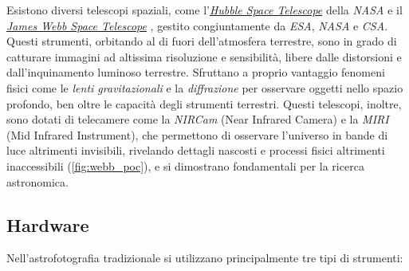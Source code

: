 Esistono diversi telescopi spaziali, come l'\textit{\href{https://hubblesite.org/home}{Hubble Space Telescope}} \cite{hubble} della \textit{NASA} e il \textit{\href{https://webbtelescope.org/home}{James Webb Space Telescope}} \cite{jwst}, gestito congiuntamente da \textit{ESA}, \textit{NASA} e \textit{CSA}. Questi strumenti, orbitando al di fuori dell'atmosfera terrestre, sono in grado di catturare immagini ad altissima risoluzione e sensibilità, libere dalle distorsioni e dall'inquinamento luminoso terrestre. Sfruttano a proprio vantaggio fenomeni fisici come le \textit{lenti gravitazionali} e la \textit{diffrazione} per osservare oggetti nello spazio profondo, ben oltre le capacità degli strumenti terrestri. Questi telescopi, inoltre, sono dotati di telecamere come la \textit{NIRCam} (Near Infrared Camera) e la \textit{MIRI} (Mid Infrared Instrument), che permettono di osservare l'universo in bande di luce altrimenti invisibili, rivelando dettagli nascosti e processi fisici altrimenti inaccessibili (\cref{fig:webb_poc}), e si dimostrano fondamentali per la ricerca astronomica.

\subsection{Hardware} \label{subsec:hardware}

Nell'astrofotografia tradizionale si utilizzano principalmente tre tipi di strumenti:

